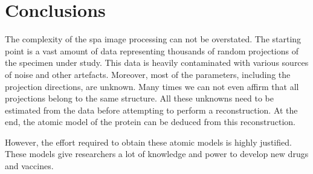 \documentclass[../main.tex]{subfiles}
\begin{document}
\section{Conclusions}
The complexity of the \gls{spa} image processing can not be overstated. The starting point is a vast amount of data representing thousands of random projections of the specimen under study. This data is heavily contaminated with various sources of noise and other artefacts. Moreover, most of the parameters, including the projection directions, are unknown. Many times we can not even affirm that all projections belong to the same structure. All these unknowns need to be estimated from the data before attempting to perform a reconstruction. At the end, the atomic model of the protein can be deduced from this reconstruction. 

However, the effort required to obtain these atomic models is highly justified. These models give researchers a lot of knowledge and power to develop new drugs and vaccines.
\end{document}
